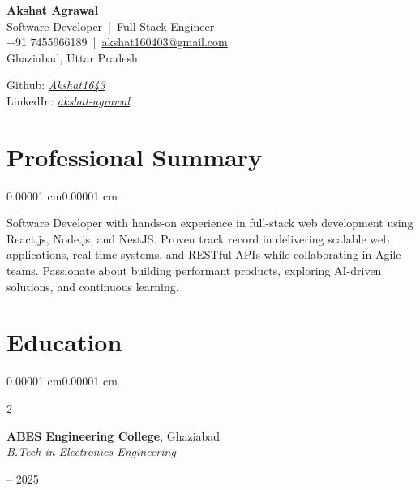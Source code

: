 \documentclass[10pt, letterpaper]{article}
\newenvironment{onecolentry}{
    \begin{adjustwidth}{0.00001 cm}{0.00001 cm}
}{
    \end{adjustwidth}
}
\newenvironment{twocolentry}[2][]{
    \onecolentry
    \def\secondColumn{#2}
    \setcolumnwidth{\fill, 4.5 cm}
    \begin{paracol}{2}
}{
    \switchcolumn \raggedleft \secondColumn
    \end{paracol}
    \endonecolentry
}
\newenvironment{header}{
    \setlength{\topsep}{0pt}\par\kern\topsep\centering\linespread{1.25}
}{
    \par\kern\topsep
}
\begin{document}
\begin{header}
\begin{minipage}[t]{0.62\textwidth}
    \raggedright
    {\fontsize{22pt}{22pt}\selectfont \textbf{Akshat Agrawal}}\\[4pt]
    Software Developer \,|\, Full Stack Engineer\\
    \vspace{0.10cm}
    +91 7455966189 \,|\, \href{mailto:akshat160403@gmail.com}{akshat160403@gmail.com}\\
    \vspace{0.10cm}
    Ghaziabad, Uttar Pradesh
    \vspace{0.10cm}
\end{minipage}%
\begin{minipage}[t]{0.38\textwidth}
    \raggedleft
    \vspace{0.01cm}
    Github: \href{[github.com](https://github.com/Akshat1643}{\textit{Akshat1643}}\\
    \vspace{0.10cm}
    LinkedIn: \href{[linkedin.com](https://www.linkedin.com/in/akshat-agrawal-53a6b2283}{\textit{akshat-agrawal}}\\
    \vspace{0.10cm}
\end{minipage}
\end{header}

\section{Professional Summary}
\vspace{0.08cm}
\begin{onecolentry}
Software Developer with hands-on experience in full-stack web development using React.js, Node.js, and NestJS. Proven track record in delivering scalable web applications, real-time systems, and RESTful APIs while collaborating in Agile teams. Passionate about building performant products, exploring AI-driven solutions, and continuous learning.
\end{onecolentry}

\section{Education}

\begin{twocolentry}{2021 -- 2025}
\textbf{ABES Engineering College}, Ghaziabad\\
\textit{B.Tech in Electronics Engineering}
\end{twocolentry}
\end{document}
